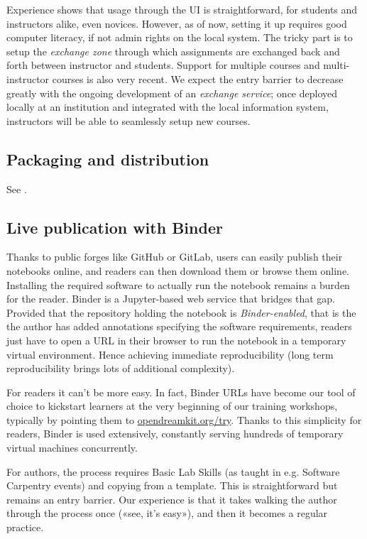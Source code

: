 \documentclass{deliverablereport}
\begin{document}
Experience shows that usage through the UI is straightforward, for
students and instructors alike, even novices. However, as of now,
setting it up requires good computer literacy, if not admin rights on the
local system. The tricky part is to setup the \emph{exchange zone}
through which assignments are exchanged back and forth between
instructor and students. Support for multiple courses and
multi-instructor courses is also very recent. We expect the entry
barrier to decrease greatly with the ongoing development of an
\emph{exchange service}; once deployed locally at an institution and
integrated with the local information system, instructors will be able
to seamlessly setup new courses.

\subsection{Packaging and distribution}

See .

\subsection{Live publication with Binder}

Thanks to public forges like GitHub or GitLab, users can easily
publish their notebooks online, and readers can then download them or
browse them online. Installing the required software to actually run
the notebook remains a burden for the reader. Binder is a
Jupyter-based web service that bridges that gap. Provided that the
repository holding the notebook is \emph{Binder-enabled}, that is the
the author has added annotations specifying the software requirements,
readers just have to open a URL in their browser to run the notebook
in a temporary virtual environment. Hence achieving immediate
reproducibility (long term reproducibility brings lots of additional
complexity).

For readers it can't be more easy. In fact, Binder URLs have become
our tool of choice to kickstart learners at the very beginning of our
training workshops, typically by pointing them to
\url{opendreamkit.org/try}. Thanks to this simplicity for readers,
Binder is used extensively, constantly serving hundreds of temporary
virtual machines concurrently.

For authors, the process requires Basic Lab Skills (as taught in e.g.
Software Carpentry events) and copying from a template. This is
straightforward but remains an entry barrier. Our experience is that
it takes walking the author through the process once («see, it's
easy»), and then it becomes a regular practice.
\end{document}
